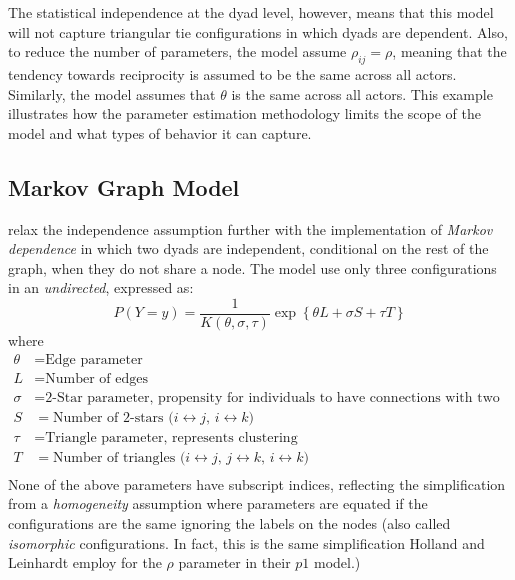 The statistical independence at the dyad level, however, means that this model will not capture triangular tie configurations in which dyads are dependent.  Also, to reduce the number of parameters, the model assume $\rho_{ij} = \rho$, meaning that the tendency towards reciprocity is assumed to be the same across all actors.  Similarly, the model assumes that $\theta$ is the same across all actors.  This example illustrates how the parameter estimation methodology limits the scope of the model and what types of behavior it can capture.  

\subsection{Markov Graph Model}
\citet{Frank:1986} relax the independence assumption further with the implementation of \textit{Markov dependence} in which two dyads are independent, conditional on the rest of the graph, when they do not share a node.  The model use only three configurations in an \textit{undirected}, expressed as:
\[
	P( Y = y ) = \frac{1}{K( \theta, \sigma, \tau)}\exp \left \{ \theta L + \sigma S + \tau T	\right \} 
	\]
where
\begin{align*}
	\theta &= 		\text{Edge parameter} \\
	L &= 		\text{Number of edges} \\
	\sigma &= \text{2-Star parameter, propensity for individuals to have connections with two actors} \\
	S &= \text{Number of 2-stars ($i \leftrightarrow j$, $i \leftrightarrow k$) }\\
	\tau	&= \text{Triangle parameter, represents clustering} \\
	T &= \text{Number of triangles ($i \leftrightarrow j$, $j \leftrightarrow k$, $i \leftrightarrow k$)} \\
\end{align*}
None of the above parameters have subscript indices, reflecting the simplification from a \textit{homogeneity} assumption where parameters are equated if the configurations are the same ignoring the labels on the nodes (also called \textit{isomorphic} configurations.  In fact, this is the same simplification Holland and Leinhardt employ for the $\rho$ parameter in their $p1$ model.)  

